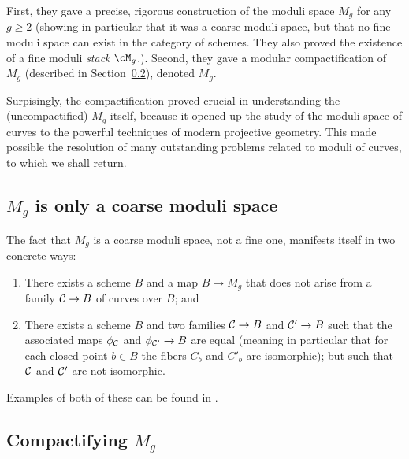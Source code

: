 First, they gave a precise, rigorous construction of the moduli space $M_g$ for any $g \geq 2$ (showing in particular that it was a coarse moduli space, but that no fine moduli space can exist in the category of schemes. They also proved the existence of a fine moduli \emph{ stack} $\cM_g$.). Second, they gave a modular compactification of $M_g$ (described in Section~\ref{compactifying Mg}), denoted $\overline M_g$. 

Surpisingly, the compactification proved crucial in understanding the (uncompactified) $M_g$ itself, because it opened up the study of the moduli space of curves to the powerful techniques of modern projective geometry. This made possible the resolution of many outstanding problems related to moduli of curves, to which we shall return. 

\subsection{$M_g$ is only a coarse moduli space}

The fact that $M_g$ is a coarse moduli space, not a fine one, manifests itself in two concrete ways:

\begin{enumerate}
\item There exists a scheme $B$ and a map $B \to M_g$ that does not arise from a family $\cC \to B$ of curves over $B$; and
\item There exists a scheme $B$ and two families $\cC \to B$ and $\cC' \to B$ such that the associated maps $\phi_\cC$ and $\phi_{\cC'} \to B$ are equal (meaning in particular that for each closed point $b \in B$ the fibers $C_b$ and $C'_b$ are isomorphic); but such that $\cC$ and $\cC'$ are not isomorphic.
\end{enumerate}

Examples of both of these can be found in \cite[****]{GeomSchemes}.

\subsection{Compactifying $M_g$}\label{compactifying Mg}

